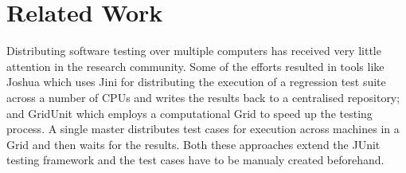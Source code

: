 \section{Related Work}
Distributing software testing over multiple computers has received very little attention in the research community. Some of the efforts resulted in tools like Joshua %
which uses Jini for distributing the execution of a regression test suite across a number of CPUs and writes the results back to a centralised repository; and 
GridUnit %
which employs a computational Grid to speed up the testing process. A single master distributes test cases for execution across machines in a Grid and then waits for the results.
Both these approaches extend the JUnit testing framework and the test cases have to be manualy created beforehand. 


